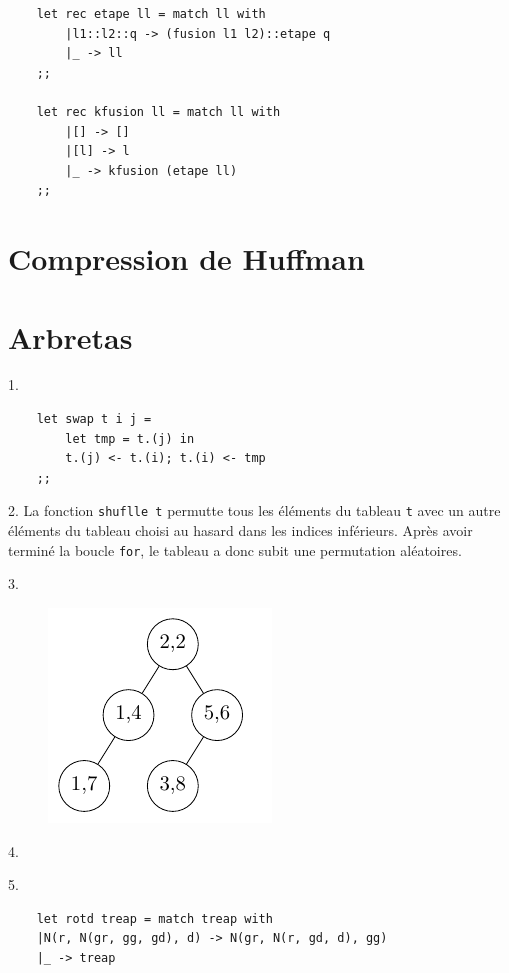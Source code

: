 \documentclass{article}
\begin{document}
\begin{verbatim}
    let rec etape ll = match ll with
        |l1::l2::q -> (fusion l1 l2)::etape q
        |_ -> ll 
    ;;

    let rec kfusion ll = match ll with
        |[] -> []
        |[l] -> l
        |_ -> kfusion (etape ll)
    ;;
\end{verbatim}

\section{Compression de Huffman}

\section{Arbretas}

1. \begin{verbatim}
    let swap t i j =
        let tmp = t.(j) in
        t.(j) <- t.(i); t.(i) <- tmp
    ;;
\end{verbatim}

2. La fonction \texttt{shuflle t} permutte tous les éléments du tableau \texttt{t} avec un autre éléments du tableau
choisi au hasard dans les indices inférieurs. Après avoir terminé la boucle \texttt{for}, le tableau a donc subit une permutation
aléatoires.

3. \begin{figure}[h]
    \centering
    \includegraphics[scale = 0.7]{drawing/III_3.pdf}
    \end{figure}

4.

5. \begin{verbatim}
    let rotd treap = match treap with
    |N(r, N(gr, gg, gd), d) -> N(gr, N(r, gd, d), gg)
    |_ -> treap
\end{verbatim}
\end{document}
